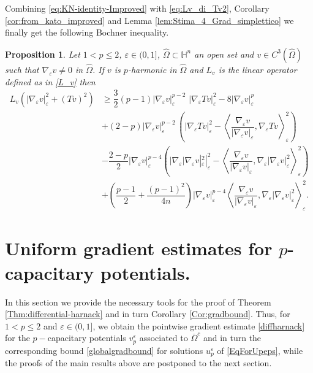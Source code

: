 \documentclass[10pt]{amsart}
\numberwithin{equation}{section}
\newtheorem{proposition}[theorem]{Proposition}
\theoremstyle{definition}
\newcommand{\He}{\mathbb{H}}
\begin{document}
Combining \eqref{eq:KN-identity-Improved} with \eqref{eq:Lv_di_Tv2}, Corollary \ref{cor:from_kato_improved} and Lemma \ref{lem:Stima_4_Grad_simplettico} we finally get the following Bochner inequality.
\begin{proposition}\label{prop:Lv_dinabla_2_e_Tv2}
	Let $1<p\leq 2$, $\varepsilon \in(0,1]$, $\widehat{\Omega} \subset \He^n$ an open set and $v\in C^3(\widehat{\Omega})$ such that $\nabla_\varepsilon v \neq 0$ in $\widehat{\Omega}$. If $v$ is $p$-harmonic in $\widehat{\Omega}$ and $L_v$ is the linear operator defined as in \eqref{L_v} then 
	\begin{equation}
		\begin{aligned}
			L_{v}(|\nabla_{\varepsilon}v|_{\varepsilon}^2 + (T v)^2) &\geq 
			\dfrac{3}{2}(p-1)|\nabla_{\varepsilon}v|_{\varepsilon}^{p-2} \,\, |\nabla_{\varepsilon}T v|_{\varepsilon}^2 - 8 |\nabla_{\varepsilon}v|_{\varepsilon}^p\\
			&+ (2-p)|\nabla_{\varepsilon}v|_{\varepsilon}^{p-2} \, \left(|\nabla_{\varepsilon}T v|_{\varepsilon}^2 - \left\langle \dfrac{\nabla_{\varepsilon}v}{|\nabla_{\varepsilon}v|_{\varepsilon}}, \nabla_{\varepsilon}T v \right\rangle^{2}_{\varepsilon}\right)\\
			&-\dfrac{2-p}{2}|\nabla_{\varepsilon}v|_{\varepsilon}^{p-4} \left(|\nabla_{\varepsilon}|\nabla_{\varepsilon}v|_{\varepsilon}^2|^2_{\varepsilon} - \left\langle \dfrac{\nabla_{\varepsilon}v}{|\nabla_{\varepsilon}v|_{\varepsilon}}, \nabla_{\varepsilon}|\nabla_{\varepsilon}v|_{\varepsilon}^2 \right\rangle_{\varepsilon}^2\right)\\
			& + \left(\dfrac{p-1}{2} + \dfrac{(p-1)^2}{4n}\right)|\nabla_{\varepsilon}v|_{\varepsilon}^{p-4} \left\langle \dfrac{\nabla_{\varepsilon}v}{|\nabla_{\varepsilon}v|_{\varepsilon}}, \nabla_{\varepsilon}|\nabla_{\varepsilon}v|_{\varepsilon}^2\right\rangle_{\varepsilon}^2.
		\end{aligned}
	\end{equation}
\end{proposition}


\section{Uniform gradient estimates for $p$-capacitary potentials.}


In this section we provide the necessary tools for the proof of Theorem \ref{Thm:differential-harnack} and in turn Corollary \ref{Cor:gradbound}. Thus, for $1<p\leq 2$ and $\varepsilon \in (0,1]$, we obtain the pointwise gradient estimate \eqref{diffharnack} for the $p-$capacitary potentials $v_p^\varepsilon$ associated to $\overline{\Omega}^c$ and in turn the corresponding bound \eqref{globalgradbound} for solutions $u_p^\varepsilon$ of \eqref{EqForUpeps}, while the proofs of the main results above are postponed to the next section.
\end{document}
